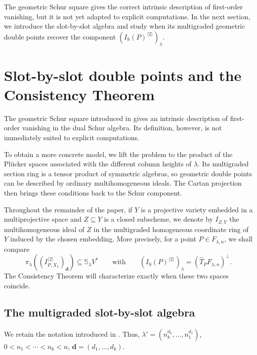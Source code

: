 \documentclass[a4paper,reqno]{amsart}
\theoremstyle{plainnopunct}
\theoremstyle{definitionnopunct}
\renewcommand{\S}{\mathbb{S}}
\newcommand{\bd}{\mathbf{d}}
\begin{document}
The geometric Schur square gives the correct intrinsic description
of first-order vanishing, but it is not yet adapted to explicit
computations. In the next section, we introduce the slot-by-slot
algebra and study when its multigraded geometric double points recover
the component $\left(
I_{\mathrm S}(P)^{\langle2\rangle}
\right)_\lambda$.

\section{Slot-by-slot double points and the Consistency Theorem}
\label{sect: slotwise double points}

\noindent The geometric Schur square introduced in
 gives an intrinsic description of
first-order vanishing in the dual Schur algebra. Its definition,
however, is not immediately suited to explicit computations.

To obtain a more concrete model, we lift the problem to the product of
the Pl\"ucker spaces associated with the different column heights of
$\lambda$. Its multigraded section ring is a tensor product of
symmetric algebras, so geometric double points can be described by
ordinary multihomogeneous ideals. The Cartan projection then brings
these conditions back to the Schur component.

Throughout the remainder of the paper, if $Y$ is a projective variety
embedded in a multiprojective space and $Z\subseteq Y$ is a closed
subscheme, we denote by $I_{Z,Y}$ the multihomogeneous ideal of $Z$ in the multigraded homogeneous
coordinate ring of $Y$ induced by the chosen embedding. More precisely, for a point $P\in F_{\lambda,n}$, we shall compare
\[
\pi_\lambda
\left(
\left(
I_{P,X_\lambda}^{\langle2\rangle}
\right)_{\bd}
\right)
\subseteq
\S_\lambda V^*
\qquad
\text{with}
\qquad
\left(
I_{\mathrm S}(P)^{\langle2\rangle}
\right)_\lambda
=
\left(
\widehat T_PF_{\lambda,n}
\right)^\perp.
\]
The Consistency Theorem will characterize exactly when these two
spaces coincide.

\subsection{The multigraded slot-by-slot algebra}
\label{subsect: slot theory}

We retain the notation introduced in
. Thus,
$\lambda'
=
(n_k^{d_k},\ldots,n_1^{d_1})$,
$0<n_1<\cdots<n_k<n$,
$\bd=(d_1,\ldots,d_k)$.
\end{document}
